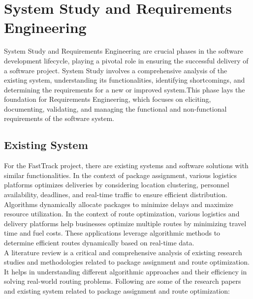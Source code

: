 \chapter{System Study and Requirements Engineering}
\label{SystemStudyandRequirementsEngineering}
System Study and Requirements Engineering are crucial phases in the software development lifecycle, playing a pivotal role in ensuring the successful delivery of a software project. System Study involves a comprehensive analysis of the existing system, understanding its functionalities, identifying shortcomings, and determining the requirements for a new or improved system.This phase lays the foundation for Requirements Engineering, which focuses on eliciting, documenting, validating, and managing the functional and non-functional requirements of the software system.
\section{Existing System}
For the FastTrack project, there are existing systems and software solutions with similar functionalities.
In the context of package assignment, various logistics platforms optimizes deliveries by considering location clustering, personnel availability, deadlines, and real-time traffic to ensure efficient distribution. Algorithms dynamically allocate packages to minimize delays and maximize resource utilization.
In the context of route optimization, various logistics and delivery platforms help businesses optimize multiple routes by minimizing travel time and fuel costs. These applications leverage algorithmic methods to determine efficient routes dynamically based on real-time data.
\\
A literature review is a critical and comprehensive analysis of existing research studies and methodologies related to package assignment and route optimization. It helps in understanding different algorithmic approaches and their efficiency in solving real-world routing problems.
Following are some of the research papers and existing system related to package assignment and route optimization:
